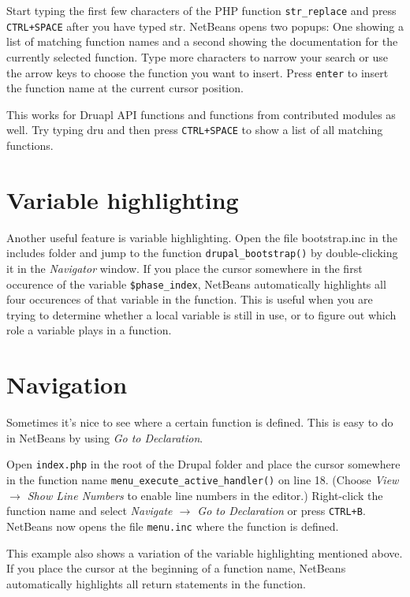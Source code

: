 \documentclass[ebook,10pt,twoside,openright]{memoir}
\begin{document}
Start typing the first few characters of the PHP function \verb!str_replace! and press \verb!CTRL+SPACE! after you have typed str. NetBeans opens two popups: One showing a list of matching function names and a second showing the documentation for the currently selected function. Type more characters to narrow your search or use the arrow keys to choose the function you want to insert. Press \verb!enter! to insert the function name at the current cursor position.

This works for Druapl API functions and functions from contributed modules as well. Try typing dru and then press \verb!CTRL+SPACE! to show a list of all matching functions.

\section{Variable highlighting}

Another useful feature is variable highlighting. Open the file bootstrap.inc in the includes folder and jump to the function \verb!drupal_bootstrap()! by double-clicking it in the \emph{Navigator} window. If you place the cursor somewhere in the first occurence of the variable \verb!$phase_index!, NetBeans automatically highlights all four occurences of that variable in the function. This is useful when you are trying to determine whether a local variable is still in use, or to figure out which role a variable plays in a function.

\section{Navigation}

Sometimes it’s nice to see where a certain function is defined. This is easy to do in NetBeans by using \emph{Go to Declaration}.

Open \verb!index.php! in the root of the Drupal folder and place the cursor somewhere in the function name \verb!menu_execute_active_handler()! on line 18. (Choose \emph{View $\rightarrow$ Show Line Numbers} to enable line numbers in the editor.) Right-click the function name and select \emph{Navigate $\rightarrow$ Go to Declaration} or press \verb!CTRL+B!. NetBeans now opens the file \verb!menu.inc! where the function is defined.

This example also shows a variation of the variable highlighting mentioned above. If you place the cursor at the beginning of a function name, NetBeans automatically highlights all return statements in the function.
\end{document}

